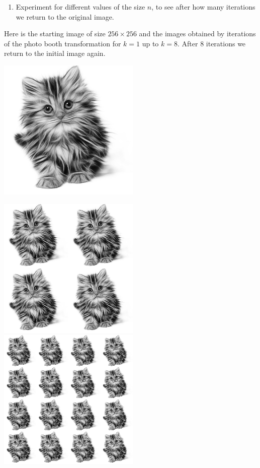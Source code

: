 \documentclass[11pt,class=report,crop=false]{standalone}
\begin{document}
\begin{activite}
\begin{enumerate}
  \item Experiment for different values of the size $n$, to see after how many iterations we return to the original image.
  
\end{enumerate}

Here is the starting image of size $256 \times 256$ and the images obtained by iterations of the photo booth transformation for $k=1$ up to $k=8$. After $8$ iterations we return to the initial image again.
\begin{center}
\includegraphics[scale=\myscale,scale=0.4]{images_chapter/cat_gimp_new_photo_0.png}
\end{center}
\begin{center}
\includegraphics[scale=\myscale,scale=0.3]{images_chapter/cat_gimp_new_photo_1.png}\qquad
\includegraphics[scale=\myscale,scale=0.3]{images_chapter/cat_gimp_new_photo_2.png}\qquad

\end{center}
\end{activite}
\end{document}
